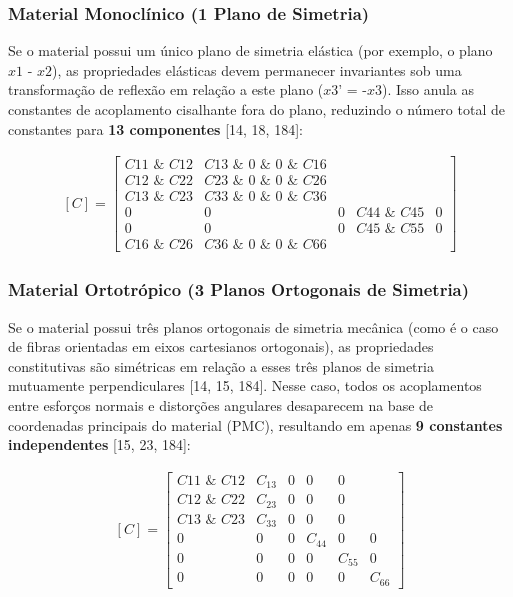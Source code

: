 \subsubsection{Material Monoclínico (1 Plano de Simetria)}
Se o material possui um único plano de simetria elástica (por exemplo, o plano $x\textit{1 - x}2$), as propriedades elásticas devem permanecer invariantes sob uma transformação de reflexão em relação a este plano ($x\textit{3' = -x}3$). Isso anula as constantes de acoplamento cisalhante fora do plano, reduzindo o número total de constantes para \textbf{13 componentes} [14, 18, 184]:

\begin{equation}
  \begin{aligned}
    [C] = \begin{bmatrix}
  C\textit{11 & C}12 & C\textit{13 & 0 & 0 & C}16 \\
  C\textit{12 & C}22 & C\textit{23 & 0 & 0 & C}26 \\
  C\textit{13 & C}23 & C\textit{33 & 0 & 0 & C}36 \\
  0 & 0 & 0 & C\textit{44 & C}45 & 0 \\
  0 & 0 & 0 & C\textit{45 & C}55 & 0 \\
  C\textit{16 & C}26 & C\textit{36 & 0 & 0 & C}66
\end{bmatrix}
  \end{aligned}
  \label{eq:monoclinic_stiffness}
\end{equation}

\subsubsection{Material Ortotrópico (3 Planos Ortogonais de Simetria)}
Se o material possui três planos ortogonais de simetria mecânica (como é o caso de fibras orientadas em eixos cartesianos ortogonais), as propriedades constitutivas são simétricas em relação a esses três planos de simetria mutuamente perpendiculares [14, 15, 184]. Nesse caso, todos os acoplamentos entre esforços normais e distorções angulares desaparecem na base de coordenadas principais do material (PMC), resultando em apenas \textbf{9 constantes independentes} [15, 23, 184]:

\begin{equation}
  \begin{aligned}
    [C] = \begin{bmatrix}
  C\textit{11 & C}12 & C_13 & 0 & 0 & 0 \\
  C\textit{12 & C}22 & C_23 & 0 & 0 & 0 \\
  C\textit{13 & C}23 & C_33 & 0 & 0 & 0 \\
  0 & 0 & 0 & C_44 & 0 & 0 \\
  0 & 0 & 0 & 0 & C_55 & 0 \\
  0 & 0 & 0 & 0 & 0 & C_66
\end{bmatrix}
  \end{aligned}
  \label{eq:orthotropic_stiffness}
\end{equation}

